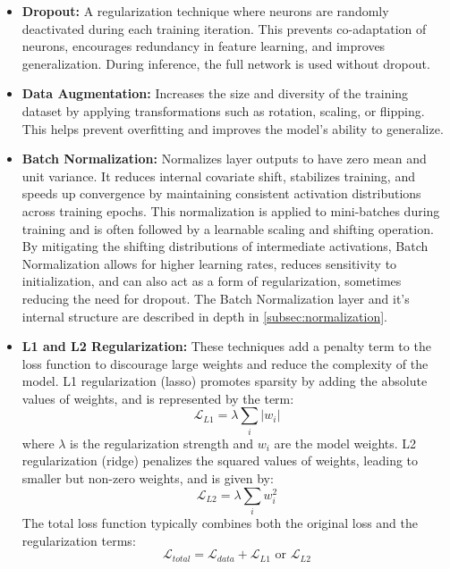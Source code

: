 \begin{itemize}
  \item \textbf{Dropout:} \autocite{10.5555/2627435.2670313} A regularization technique where neurons are randomly deactivated during each training iteration. This prevents co-adaptation of neurons, encourages redundancy in feature learning, and improves generalization. During inference, the full network is used without dropout.

  \item \textbf{Data Augmentation:} \autocite{10.1145/3510413} Increases the size and diversity of the training dataset by applying transformations such as rotation, scaling, or flipping. This helps prevent overfitting and improves the model's ability to generalize.

  \item \textbf{Batch Normalization:} \autocite{NEURIPS2018_36072923} \autocite{10.1145/3510413} Normalizes layer outputs to have zero mean and unit variance. It reduces internal covariate shift, stabilizes training, and speeds up convergence by maintaining consistent activation distributions across training epochs. This normalization is applied to mini-batches during training and is often followed by a learnable scaling and shifting operation. By mitigating the shifting distributions of intermediate activations, Batch Normalization allows for higher learning rates, reduces sensitivity to initialization, and can also act as a form of regularization, sometimes reducing the need for dropout. The Batch Normalization layer and it's internal structure are described in depth in \autoref{subsec:normalization}.

  \item \textbf{L1 and L2 Regularization:} \autocite{kukačka2017regularizationdeeplearningtaxonomy} These techniques add a penalty term to the loss function to discourage large weights and reduce the complexity of the model. L1 regularization (lasso) promotes sparsity by adding the absolute values of weights, and is represented by the term:
    \[
      \mathcal{L}_{L1} = \lambda \sum_{i} |w_i|
    \]
    where \( \lambda \) is the regularization strength and \( w_i \) are the model weights. L2 regularization (ridge) penalizes the squared values of weights, leading to smaller but non-zero weights, and is given by:
    \[
      \mathcal{L}_{L2} = \lambda \sum_{i} w_i^2
    \]
    The total loss function typically combines both the original loss and the regularization terms:
    \[
      \mathcal{L}_{total} = \mathcal{L}_{data} + \mathcal{L}_{L1} \text{ or } \mathcal{L}_{L2}
    \]
\end{itemize}

